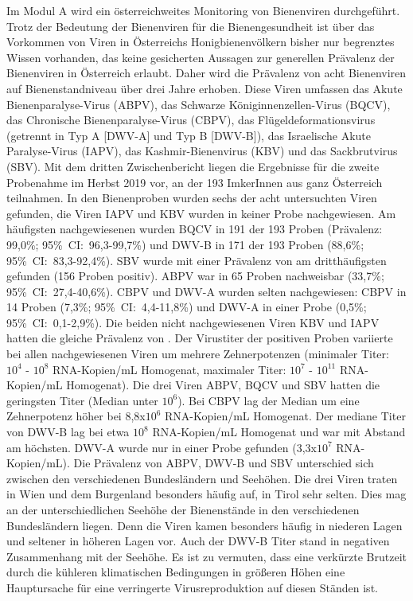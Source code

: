 Im Modul A wird ein österreichweites Monitoring von Bienenviren durchgeführt. Trotz der Bedeutung der Bienenviren für die Bienengesundheit ist über das Vorkommen von Viren in Österreichs Honigbienenvölkern bisher nur begrenztes Wissen vorhanden, das keine gesicherten Aussagen zur generellen Prävalenz der Bienenviren in Österreich erlaubt. Daher wird die Prävalenz von acht Bienenviren auf Bienenstandniveau über drei Jahre erhoben. Diese Viren umfassen das Akute Bienenparalyse-Virus (ABPV), das Schwarze Königinnenzellen-Virus (BQCV), das Chronische Bienenparalyse-Virus (CBPV), das Flügeldeformationsvirus (getrennt in Typ A [DWV-A] und Typ B [DWV-B]), das Israelische Akute Paralyse-Virus (IAPV), das Kashmir-Bienenvirus (KBV) und das Sackbrutvirus (SBV). 
\newline
Mit dem dritten Zwischenbericht liegen die Ergebnisse für die zweite Probenahme im Herbst 2019 vor, an der 193 ImkerInnen aus ganz Österreich teilnahmen. In den Bienenproben wurden sechs der acht untersuchten Viren gefunden, die Viren IAPV und KBV wurden in keiner Probe nachgewiesen. Am häufigsten nachgewiesenen wurden BQCV in 191 der 193 Proben (Prävalenz: 99,0\%; 95\%~CI:~96,3-99,7\%) und DWV-B in 171 der 193 Proben (88,6\%; 95\%~CI:~83,3-92,4\%). SBV wurde mit einer Prävalenz von  am dritthäufigsten gefunden (156 Proben positiv). ABPV war in 65 Proben nachweisbar (33,7\%; 95\%~CI:~27,4-40,6\%). CBPV und DWV-A wurden selten nachgewiesen: CBPV in 14 Proben (7,3\%; 95\%~CI:~4,4-11,8\%) und DWV-A in einer Probe (0,5\%; 95\%~CI:~0,1-2,9\%). Die beiden nicht nachgewiesenen Viren KBV und IAPV hatten die gleiche Prävalenz von .
\newline
Der Virustiter der positiven Proben variierte bei allen nachgewiesenen Viren um mehrere Zehnerpotenzen (minimaler Titer: $10^4$ - $10^8$ RNA-Kopien/\si{\milli\liter} Homogenat, maximaler Titer: $10^7$ - $10^{11}$ RNA-Kopien/\si{\milli\liter} Homogenat). Die drei Viren ABPV, BQCV und SBV hatten die geringsten Titer (Median unter $10^6$). Bei CBPV lag der Median um eine Zehnerpotenz höher bei 8,8x$10^6$ RNA-Kopien/\si{\milli\liter} Homogenat. Der mediane Titer von DWV-B lag bei etwa $10^8$ RNA-Kopien/\si{\milli\liter} Homogenat und war mit Abstand am höchsten. DWV-A wurde nur in einer Probe gefunden (3,3x$10^7$ RNA-Kopien/\si{\milli\liter}).
\newline
Die Prävalenz von ABPV, DWV-B und SBV unterschied sich zwischen den verschiedenen Bundesländern und Seehöhen. Die drei Viren traten in Wien und dem Burgenland besonders häufig auf, in Tirol sehr selten. Dies mag an der unterschiedlichen Seehöhe der Bienenstände in den verschiedenen Bundesländern liegen. Denn die Viren kamen besonders häufig in niederen Lagen und seltener in höheren Lagen vor. Auch der DWV-B Titer stand in negativen Zusammenhang mit der Seehöhe. Es ist zu vermuten, dass eine verkürzte Brutzeit durch die kühleren klimatischen Bedingungen in größeren Höhen eine Hauptursache für eine verringerte Virusreproduktion auf diesen Ständen ist.
